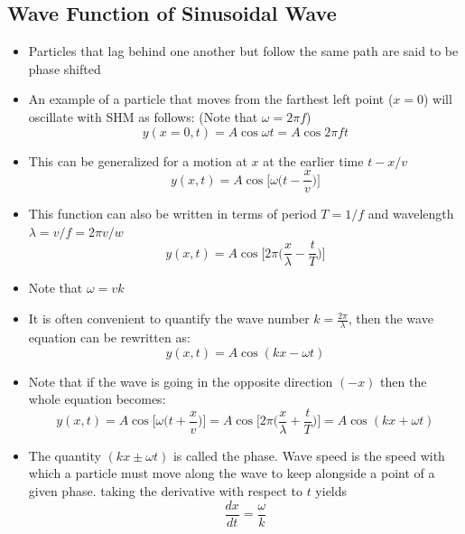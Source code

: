 \documentclass[11pt, a4paper]{article}
\begin{document}
\subsection{Wave Function of Sinusoidal Wave}
\begin{itemize}
    \item Particles that lag behind one another but follow the same path are said to be phase
        shifted
    \item An example of a particle that moves from the farthest left point ($x=0$) will
        oscillate with SHM as follows: (Note that $\omega = 2\pi{}f$)
        \begin{equation}
            y(x=0,t) = A\cos\omega{}t = A\cos{}2\pi{}ft
        \end{equation}
    \item This can be generalized for a motion at $x$ at the earlier time $t - x/v$
        \begin{equation}
            y(x,t) = A\cos\bigg[\omega\bigg(t-\frac{x}{v}\bigg)\bigg]
        \end{equation}
    \item This function can also be written in terms of period $T = 1/f$ and wavelength
        $\lambda = v/f = 2\pi v/w$
        \begin{equation}
            y(x,t) = A\cos\bigg[ 2\pi\bigg(\frac{x}{\lambda}-\frac{t}{T}\bigg)\bigg]
        \end{equation}
    \item Note that $\omega = vk$
    \item It is often convenient to quantify the wave number $k = \frac{2\pi}{\lambda}$,
        then the wave equation can be rewritten as:
        \begin{equation}
            y(x,t) = A\cos(kx - \omega{}t)
        \end{equation}
    \item Note that if the wave is going in the opposite direction $(-x)$ then the whole
        equation becomes:
        \begin{equation}
            y(x,t) = A\cos\bigg[\omega\bigg(t+\frac{x}{v}\bigg)\bigg] =
            A\cos\bigg[ 2\pi\bigg(\frac{x}{\lambda}+\frac{t}{T}\bigg)\bigg]
            = A\cos(kx + \omega{}t)
        \end{equation}
    \item The quantity $(kx \pm \omega t)$ is called the phase. Wave speed is the speed
        with which a particle must move along the wave to keep alongside a point of a given phase.
        taking the derivative with respect to $t$ yields
        \begin{equation}
            \frac{dx}{dt} = \frac{\omega}{k}
        \end{equation}
\end{itemize}
\end{document}
